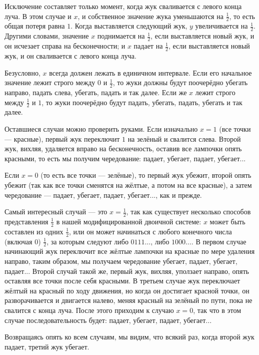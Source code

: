 Исключение составляет только момент, когда жук сваливается с левого конца луча.
В этом случае и $x$, и собственное значение жука уменьшаются на $\tfrac12$, то есть общая потеря равна $1$.
Когда выставляется следующий жук, $y$ увеличивается на $\tfrac12$.
Другими словами, значение $x$ поднимается на $\tfrac12$, если выставляется новый жук, и он исчезает справа на бесконечности; и $x$ падает на $\tfrac12$, если выставляется новый жук, и он сваливается с левого конца луча.

Безусловно, $x$ всегда должен лежать в единичном интервале.
Если его начальное значение лежит строго между $0$ и $\tfrac12$, то жуки должны будут поочерёдно убегать направо, падать слева, убегать, падать и так далее.
Если же $x$ лежит строго между $\tfrac12$ и $1$, то жуки поочерёдно будут падать, убегать, падать, убегать и так далее.

Оставшиеся случаи можно проверить руками.
Если изначально $x = 1$ (все точки --- красные), первый жук переключит $1$ на зелёный и свалится слева.
Второй жук, вихляя, удаляется вправо на бесконечность, оставив все лампочки опять красными, то есть мы получим чередование: падает, убегает, падает, убегает...

Если $x = 0$ (то есть все точки --- зелёные), то первый жук убежит, второй опять убежит (так как все точки сменятся на жёлтые, а потом на все красные), а затем чередование --- падает, убегает, падает, убегает..., как и прежде.

Самый интересный случай --- это $x=\tfrac12$, так как существует несколько способов представления $\tfrac12$ в нашей модифицированной двоичной системе: $x$ может быть составлен из одних $\tfrac12$, или он может начинаться с любого конечного числа (включая 0) $\tfrac12$, за которым следуют либо $0111\dots$, либо $1000\dots$.
В первом случае начинающий жук переключит все жёлтые лампочки на красные по мере удаления направо, таким образом, мы получаем чередование  убегает, падает, убегает, падает...
Второй случай такой же, первый жук, вихляя, уползает направо, опять оставляя все точки после себя красными.
В третьем случае жук переключает жёлтый на красный по ходу движения, но когда он достигает красной точки, он разворачивается и двигается налево, меняя красный на зелёный по пути, пока не свалится с конца луча.
После этого приходим к случаю $x = 0$, так что в этом случае  последовательность будет: падает, убегает, падает, убегает...

Возвращаясь опять ко всем случаям, мы видим, что всякий раз, когда второй жук падает, третий жук убегает.
\heart


